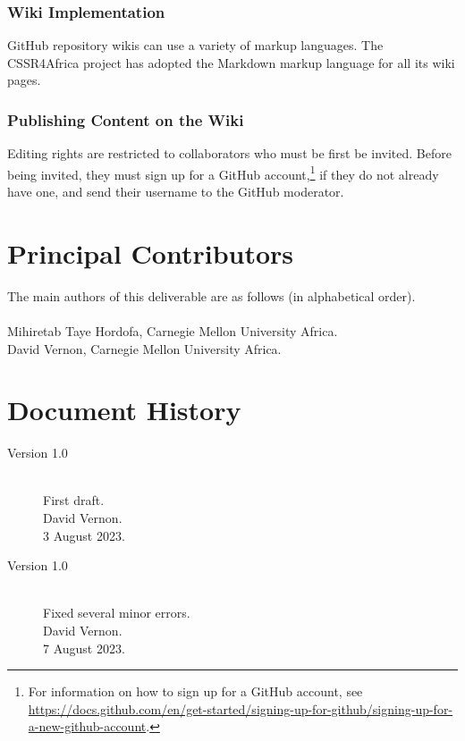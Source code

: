\documentclass{CSSRforAfrica}
\newcommand{\blank}{~\\}
\begin{document}
\subsubsection{Wiki Implementation}
GitHub repository wikis can use a variety of markup languages. The CSSR4Africa project has adopted the Markdown markup language for all its wiki pages.


\subsubsection{Publishing Content on the Wiki}
Editing rights are restricted to collaborators who must be first be invited. Before being invited, they must sign up for a GitHub account,\footnote{For information on how to sign up for a GitHub account, see {\scriptsize \url {https://docs.github.com/en/get-started/signing-up-for-github/signing-up-for-a-new-github-account}}.} if they do not already have one, and send their username to the GitHub moderator. 



\newpage




\pagebreak
\section*{Principal Contributors}
\label{contributors}
The main authors of this deliverable are as follows (in alphabetical order).
\blank
~
\blank
Mihiretab Taye Hordofa, Carnegie Mellon University Africa.\\ 
David Vernon, Carnegie Mellon University Africa.\\   

  

\newpage
\section*{Document History}
\label{document_history}

\begin{description}

\item [Version 1.0]~\\
First draft. \\
David Vernon. \\                          
3 August 2023.                                    

\item [Version 1.0]~\\
Fixed several minor errors. \\
David Vernon. \\                          
7 August 2023.    

\end{description}
\end{document}

